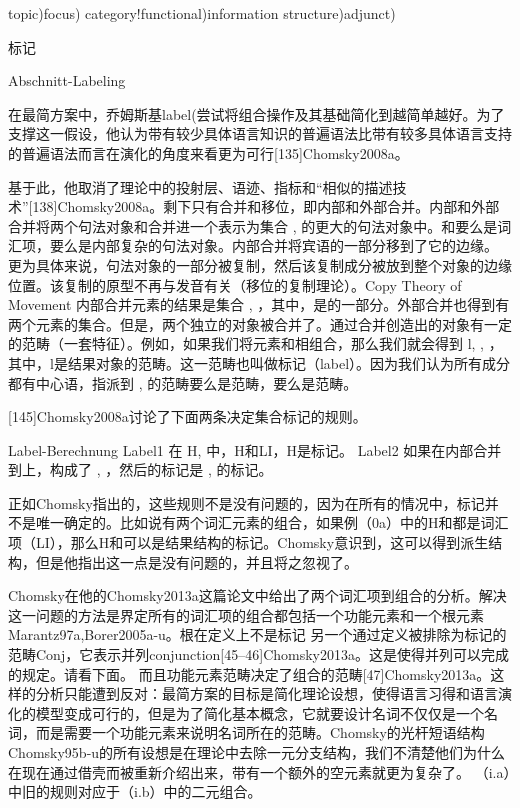 topic)focus)
category!functional)information structure)adjunct)


标记

Abschnitt-Labeling

在最简方案中，乔姆斯基label(尝试将组合操作及其基础简化到越简单越好。为了支撑这一假设，他认为带有较少具体语言知识的普遍语法比带有较多具体语言支持的普遍语法而言在演化的角度来看更为可行[135]Chomsky2008a。




基于此，他取消了理论中的投射层、语迹、指标和“相似的描述技术”[138]Chomsky2008a。剩下只有合并和移位，即内部和外部合并。内部和外部合并将两个句法对象和合并进一个表示为集合 ,  的更大的句法对象中。和要么是词汇项，要么是内部复杂的句法对象。内部合并将宾语的一部分移到了它的边缘。 
更为具体来说，句法对象的一部分被复制，然后该复制成分被放到整个对象的边缘位置。该复制的原型不再与发音有关（移位的复制理论）。Copy Theory of Movement
内部合并元素的结果是集合 ,  ，其中，是的一部分。外部合并也得到有两个元素的集合。但是，两个独立的对象被合并了。通过合并创造出的对象有一定的范畴（一套特征）。例如，如果我们将元素和相组合，那么我们就会得到 l,  ,   ，其中，l是结果对象的范畴。这一范畴也叫做标记（label）。因为我们认为所有成分都有中心语，指派到 ,  的范畴要么是范畴，要么是范畴。


















[145]Chomsky2008a讨论了下面两条决定集合标记的规则。


Label-Berechnung
Label1 在 H,  中，H和LI，H是标记。
Label2 如果在内部合并到上，构成了 ,  ，然后的标记是 ,  的标记。




正如Chomsky指出的，这些规则不是没有问题的，因为在所有的情况中，标记并不是唯一确定的。比如说有两个词汇元素的组合，如果例（0a）中的H和都是词汇项（LI），那么H和可以是结果结构的标记。Chomsky意识到，这可以得到派生结构，但是他指出这一点是没有问题的，并且将之忽视了。













Chomsky在他的Chomsky2013a这篇论文中给出了两个词汇项到组合的分析。解决这一问题的方法是界定所有的词汇项的组合都包括一个功能元素和一个根元素Marantz97a,Borer2005a-u。根在定义上不是标记 
另一个通过定义被排除为标记的范畴Conj，它表示并列conjunction[45--46]Chomsky2013a。这是使得并列可以完成的规定。请看下面。
而且功能元素范畴决定了组合的范畴[47]Chomsky2013a。这样的分析只能遭到反对：最简方案的目标是简化理论设想，使得语言习得和语言演化的模型变成可行的，但是为了简化基本概念，它就要设计名词不仅仅是一个名词，而是需要一个功能元素来说明名词所在的范畴。Chomsky的光杆短语结构Chomsky95b-u的所有设想是在理论中去除一元分支结构，我们不清楚他们为什么在现在通过借壳而被重新介绍出来，带有一个额外的空元素就更为复杂了。 
（i.a）中旧的规则对应于（i.b）中的二元组合。


